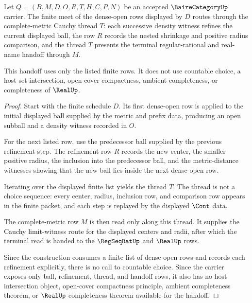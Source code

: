 \begin{theorem}
\label{thm:baire-category-finite-meet-density-handoff}
Let $Q=(B,M,D,O,R,T,H,C,P,N)$ be an accepted $\BaireCategoryUp$ carrier. The
finite meet of the dense-open rows displayed by $D$ routes through the
complete-metric Cauchy thread $T$: each successive density witness refines the
current displayed ball, the row $R$ records the nested shrinkage and positive
radius comparison, and the thread $T$ presents the terminal regular-rational
and real-name handoff through $M$.

This handoff uses only the listed finite rows. It does not use countable
choice, a host set intersection, open-cover compactness, ambient completeness,
or completeness of $\RealUp$.
\end{theorem}
\begin{proof}
Start with the finite schedule $D$. Its first dense-open row is applied to the
initial displayed ball supplied by the metric and prefix data, producing an
open subball and a density witness recorded in $O$.

For the next listed row, use the predecessor ball supplied by the previous
refinement step. The refinement row $R$ records the new center, the smaller
positive radius, the inclusion into the predecessor ball, and the
metric-distance witnesses showing that the new ball lies inside the next
dense-open row.

Iterating over the displayed finite list yields the thread $T$. The thread is
not a choice sequence: every center, radius, inclusion row, and comparison row
appears in the finite packet, and each step is replayed by the displayed
$\Cont$ data.

The complete-metric row $M$ is then read only along this thread. It supplies
the Cauchy limit-witness route for the displayed centers and radii, after
which the terminal read is handed to the $\RegSeqRatUp$ and $\RealUp$ rows.

Since the construction consumes a finite list of dense-open rows and records
each refinement explicitly, there is no call to countable choice. Since the
carrier exposes only ball, refinement, thread, and handoff rows, it also has no
host intersection object, open-cover compactness principle, ambient
completeness theorem, or $\RealUp$ completeness theorem available for the
handoff.
\end{proof}

